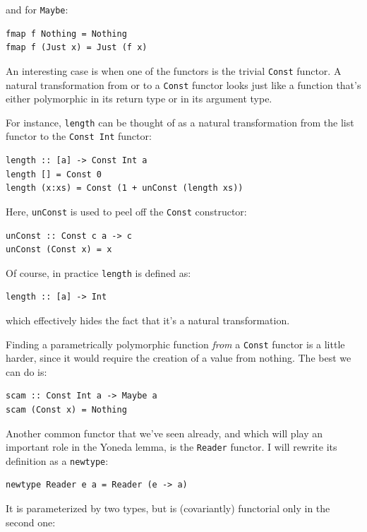 and for \texttt{Maybe}:

\begin{verbatim}
fmap f Nothing = Nothing
fmap f (Just x) = Just (f x)
\end{verbatim}

An interesting case is when one of the functors is the trivial
\texttt{Const} functor. A natural transformation from or to a
\texttt{Const} functor looks just like a function that's either
polymorphic in its return type or in its argument type.

For instance, \texttt{length} can be thought of as a natural
transformation from the list functor to the \texttt{Const\ Int} functor:

\begin{verbatim}
length :: [a] -> Const Int a
length [] = Const 0
length (x:xs) = Const (1 + unConst (length xs))
\end{verbatim}

Here, \texttt{unConst} is used to peel off the \texttt{Const}
constructor:

\begin{verbatim}
unConst :: Const c a -> c
unConst (Const x) = x
\end{verbatim}

Of course, in practice \texttt{length} is defined as:

\begin{verbatim}
length :: [a] -> Int
\end{verbatim}

which effectively hides the fact that it's a natural transformation.

Finding a parametrically polymorphic function \emph{from} a
\texttt{Const} functor is a little harder, since it would require the
creation of a value from nothing. The best we can do is:

\begin{verbatim}
scam :: Const Int a -> Maybe a
scam (Const x) = Nothing
\end{verbatim}

Another common functor that we've seen already, and which will play an
important role in the Yoneda lemma, is the \texttt{Reader} functor. I
will rewrite its definition as a \texttt{newtype}:

\begin{verbatim}
newtype Reader e a = Reader (e -> a)
\end{verbatim}

It is parameterized by two types, but is (covariantly) functorial only
in the second one:

